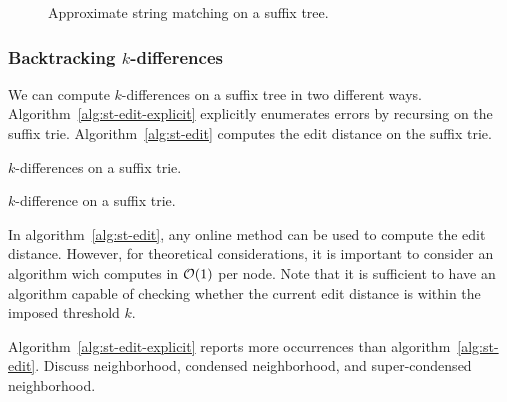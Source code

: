 \begin{figure}[h]
\begin{center}
\caption{Approximate string matching on a suffix tree.}
\label{fig:st-hamming}

\end{center}
\end{figure}

\subsubsection{Backtracking $k$-differences}

We can compute $k$-differences on a suffix tree in two different ways. Algorithm~\ref{alg:st-edit-explicit} explicitly enumerates errors by recursing on the suffix trie. Algorithm~\ref{alg:st-edit} computes the edit distance on the suffix trie.

\begin{algorithm}[h]
\caption{$k$-differences on a suffix trie.}
\label{alg:st-edit-explicit}
\begin{algorithmic}[1]
		\State {}
	\Else 
		\State {}
		\ForAll {$\Cn \in \Ci(\Tn)$}
			\State {}
				\State {}
			\Else
				\State {}
			\EndIf
		\EndFor
	\EndIf
\EndProcedure
\end{algorithmic}
\end{algorithm}

\begin{algorithm}[h]
\caption{$k$-difference on a suffix trie.}
\label{alg:st-edit}
\begin{algorithmic}[1]
	\ForAll {$\Cn \in \Ci(\Tn)$}
		\State {}
	\EndFor
\EndProcedure
\end{algorithmic}
\end{algorithm}

In algorithm~\ref{alg:st-edit}, any online method can be used to compute the edit distance.
However, for theoretical considerations, it is important to consider an algorithm wich computes in $\mathcal{O}(1)$ per node.
Note that it is sufficient to have an algorithm capable of checking whether the current edit distance is within the imposed threshold $k$.

Algorithm~\ref{alg:st-edit-explicit} reports more occurrences than algorithm~\ref{alg:st-edit}.
Discuss neighborhood, condensed neighborhood, and super-condensed neighborhood.

